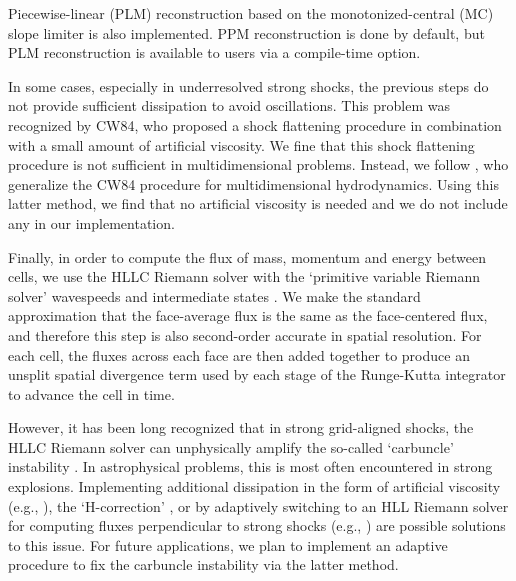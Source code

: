 \documentclass[fleqn,usenatbib]{mnras}
\begin{document}
Piecewise-linear (PLM) reconstruction based on the monotonized-central (MC) slope limiter is also implemented. PPM reconstruction is done by default, but PLM reconstruction is available to users via a compile-time option.

In some cases, especially in underresolved strong shocks, the previous steps do not provide sufficient dissipation to avoid oscillations. This problem was recognized by CW84, who proposed a shock flattening procedure in combination with a small amount of artificial viscosity. We fine that this shock flattening procedure is not sufficient in multidimensional problems. Instead, we follow \cite{Miller_2002}, who generalize the CW84 procedure for multidimensional hydrodynamics. Using this latter method, we find that no artificial viscosity is needed and we do not include any in our implementation.

Finally, in order to compute the flux of mass, momentum and energy between cells, we use the HLLC Riemann solver with the `primitive variable Riemann solver' wavespeeds and intermediate states \citep{Toro_2013}. We make the standard approximation that the face-average flux is the same as the face-centered flux, and therefore this step is also second-order accurate in spatial resolution. For each cell, the fluxes across each face are then added together to produce an unsplit spatial divergence term used by each stage of the Runge-Kutta integrator to advance the cell in time.

However, it has been long recognized that in strong grid-aligned shocks, the HLLC Riemann solver can unphysically amplify the so-called `carbuncle' instability \citep{Quirk_1994}. In astrophysical problems, this is most often encountered in strong explosions. Implementing additional dissipation in the form of artificial viscosity (e.g., \citealt{Gittings_2008}), the `H-correction' \citep{Sanders_1998}, or by adaptively switching to an HLL Riemann solver for computing fluxes perpendicular to strong shocks (e.g., \citealt{Quirk_1994,Skinner_2019}) are possible solutions to this issue. For future applications, we plan to implement an adaptive procedure to fix the carbuncle instability via the latter method.
\end{document}
